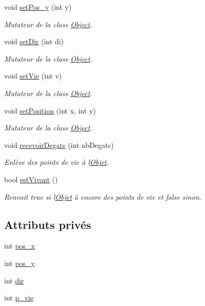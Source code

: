 \begin{DoxyCompactItemize}
void \hyperlink{class_object_a35340b9a66cc2d561ad370783c41fcac}{set\+Pos\+\_\+y} (int y)
\begin{DoxyCompactList}\small\item\em Mutateur de la class \hyperlink{class_object}{Object}. \end{DoxyCompactList}\item 
void \hyperlink{class_object_a6d72ba9034f1ea3a0866574705e938d3}{set\+Dir} (int di)
\begin{DoxyCompactList}\small\item\em Mutateur de la class \hyperlink{class_object}{Object}. \end{DoxyCompactList}\item 
void \hyperlink{class_object_ac0880db52bcbcd3022278d62956d666e}{set\+Vie} (int v)
\begin{DoxyCompactList}\small\item\em Mutateur de la class \hyperlink{class_object}{Object}. \end{DoxyCompactList}\item 
void \hyperlink{class_object_a9e7f78b7cc24ebe4d11e8ce7b86c1d49}{set\+Position} (int x, int y)
\begin{DoxyCompactList}\small\item\em Mutateur de la class \hyperlink{class_object}{Object}. \end{DoxyCompactList}\item 
void \hyperlink{class_object_a98f9245de6001ab13932531b047ba595}{recevoir\+Degats} (int nb\+Degats)
\begin{DoxyCompactList}\small\item\em Enlève des points de vie à l\textquotesingle{}\hyperlink{class_objet}{Objet}. \end{DoxyCompactList}\item 
bool \hyperlink{class_object_ae013d3c24ca77287536bfc594f763b60}{est\+Vivant} ()
\begin{DoxyCompactList}\small\item\em Renvoit true si l\textquotesingle{}\hyperlink{class_objet}{Objet} à encore des points de vie et false sinon. \end{DoxyCompactList}\end{DoxyCompactItemize}
\subsection*{Attributs privés}
\begin{DoxyCompactItemize}
\item 
int \hyperlink{class_object_a2fc9911a2ee453f97ccfad331dc29e3a}{pos\+\_\+x}
\item 
int \hyperlink{class_object_a5acac61f66b23f32ad2ed7aa2e93c307}{pos\+\_\+y}
\item 
int \hyperlink{class_object_a1267bc5eb5865f7ad9de7d822483c0e0}{dir}
\item 
int \hyperlink{class_object_a1710b8b8e0d814406f84ca905d411e69}{p\+\_\+vie}
\end{DoxyCompactItemize}


